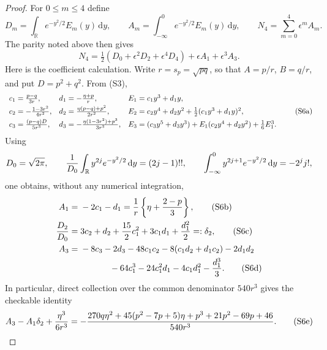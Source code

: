 \documentclass[11pt,a4paper]{article}
\numberwithin{equation}{section}
\theoremstyle{definition}
\theoremstyle{remark}
\newcommand{\dd}{\,\mathrm d}
\begin{document}
\begin{proof}
For $0\le m\le4$ define
\[
 D_m=\int_{\mathbb R}e^{-y^2/2}E_m(y)\dd y,\qquad
 A_m=\int_{-\infty}^0e^{-y^2/2}E_m(y)\dd y,
 \qquad N_4=\sum_{m=0}^4\epsilon^mA_m.
\]
The parity noted above then gives
\[
 N_4=\tfrac12(D_0+\epsilon^2D_2+\epsilon^4D_4)
       +\epsilon A_1+\epsilon^3A_3.
\]
Here is the coefficient calculation.  Write $r=s_p=\sqrt{pq}$, so that
$A=p/r$, $B=q/r$, and put $D=p^2+q^2$.  From (S3),
\[
\begin{array}{lll}
 c_1={p-q\over3r},& d_1=-{\eta+p\over r},
 &E_1=c_1y^3+d_1y,\\[1mm]
 c_2=-{1-3r^2\over4r^2},&d_2={\eta(p-q)+p^2\over2r^2},
 &E_2=c_2y^4+d_2y^2+\tfrac12(c_1y^3+d_1y)^2,\\[1mm]
 c_3={(p-q)D\over5r^3},&
 d_3=-{\eta(1-3r^2)+p^3\over3r^3},
 &E_3=(c_3y^5+d_3y^3)+E_1(c_2y^4+d_2y^2)+\tfrac16E_1^3.
\end{array}                                                   \tag{S6a}
\]
Using
\[
 D_0=\sqrt{2\pi},\qquad
 {1\over D_0}\int_{\mathbb R}y^{2j}e^{-y^2/2}\dd y=(2j-1)!!,\qquad
 \int_{-\infty}^0y^{2j+1}e^{-y^2/2}\dd y=-2^j j!,
\]
one obtains, without any numerical integration,
\begin{align}
 A_1={}&-2c_1-d_1={1\over r}\left\{\eta+{2-p\over3}\right\},
                                                               \tag{S6b}\\
 {D_2\over D_0}={}&3c_2+d_2+{15\over2}c_1^2+3c_1d_1+{d_1^2\over2}
 =:\delta_2,                                                   \tag{S6c}\\
 A_3={}&-8c_3-2d_3-48c_1c_2-8(c_1d_2+d_1c_2)-2d_1d_2\notag\\
 &\hspace{12mm}-64c_1^3-24c_1^2d_1-4c_1d_1^2-{d_1^3\over3}.    \tag{S6d}
\end{align}
In particular, direct collection over the common denominator $540r^3$
gives the checkable identity
\begin{equation}
 A_3-A_1\delta_2+{\eta^3\over6r^3}
 =-{270q\eta^2+45(p^2-7p+5)\eta
          +p^3+21p^2-69p+46\over540r^3}.                       \tag{S6e}
\end{equation}


\end{proof}
\end{document}

